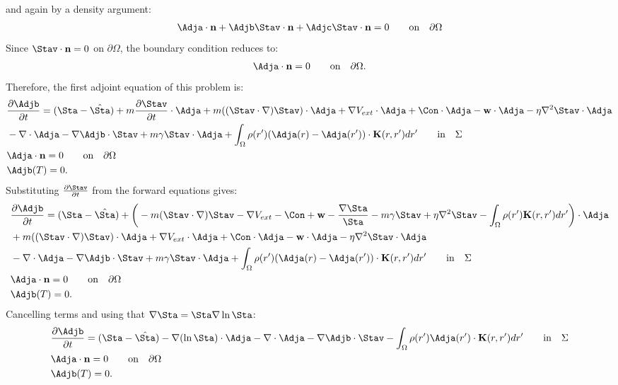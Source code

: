 and again by a density argument:
\begin{align*}
 \Adja \cdot \mathbf{n}  +  \Adjb \Stav \cdot \mathbf{n}   +\Adjc \Stav \cdot \mathbf{n} = 0\qquad \text{on} \quad \partial \Omega
\end{align*}
Since $\Stav \cdot \mathbf{n} =0$ on $ \partial\Omega$, the boundary condition reduces to:
\begin{align*}
\Adja \cdot \mathbf{n} = 0 \qquad \text{on} \quad \partial\Omega.
\end{align*}
Therefore, the first adjoint equation of this problem is:
\begin{align*}
& \frac{\partial \Adjb}{\partial t} = (\Sta - \hat \Sta) +m  \frac{\partial \Stav}{\partial t}\cdot \Adja + m ( (\Stav \cdot \nabla)\Stav) \cdot \Adja+ \nabla V_{ext}\cdot \Adja + \Con \cdot \Adja - \mathbf{w} \cdot \Adja  - \eta \nabla^2 \Stav \cdot \Adja \\
&-\nabla\cdot \Adja  -  \nabla \Adjb \cdot \Stav + m \gamma \Stav \cdot \Adja + \int_\Omega  \rho(r')(\Adja(r) - \Adja(r')) \cdot\mathbf{K}(r,r')   dr' \qquad \text{in} \quad \Sigma \\
& \Adja \cdot \mathbf{n} = 0 \qquad \text{on} \quad \partial\Omega\\
 &\Adjb(T) = {0} .
\end{align*}
Substituting $\frac{\partial \Stav}{\partial t}$ from the forward equations gives:
\begin{align*}
& \frac{\partial \Adjb}{\partial t} = (\Sta - \hat \Sta) +\bigg(- m (\Stav \cdot \nabla)\Stav -\nabla V_{ext} -\Con +\mathbf{w} - \frac{\nabla \Sta}{\Sta} - m\gamma \Stav + \eta  \nabla^2 \Stav -\int_\Omega  \rho(r') \mathbf{K}(r,r')dr' \bigg)\cdot \Adja         \\
&+ m ( (\Stav \cdot \nabla)\Stav) \cdot \Adja+ \nabla V_{ext}\cdot \Adja + \Con \cdot \Adja - \mathbf{w} \cdot \Adja  - \eta \nabla^2 \Stav \cdot \Adja \\
&-\nabla\cdot \Adja  -  \nabla \Adjb \cdot \Stav + m \gamma \Stav \cdot \Adja + \int_\Omega  \rho(r')(\Adja(r) - \Adja(r')) \cdot\mathbf{K}(r,r')  dr' \qquad \text{in} \quad \Sigma \\
& \Adja \cdot \mathbf{n} = 0 \qquad \text{on} \quad \partial \Omega\\
&\Adjb(T) = {0} .
\end{align*}
Cancelling terms and using that $\nabla \Sta = \Sta \nabla \ln \Sta$:
\begin{align*}
& \frac{\partial \Adjb}{\partial t} = (\Sta - \hat \Sta) - \nabla (\ln \Sta)\cdot \Adja -\nabla\cdot \Adja  -  \nabla \Adjb \cdot \Stav  - \int_\Omega  \rho(r')\Adja(r') \cdot\mathbf{K}(r,r')   dr' \qquad \text{in} \quad \Sigma \\
& \Adja \cdot \mathbf{n} = 0 \qquad \text{on} \quad \partial \Omega\\
&\Adjb(T) = {0} .
\end{align*}

